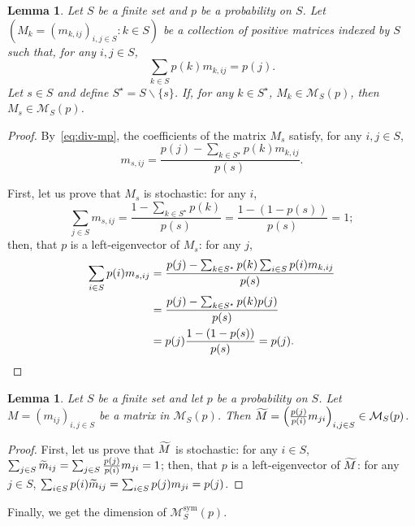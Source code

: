 \documentclass[10pt]{amsart}
\newtheorem{lemm}[theo]{Lemma}\newtheorem{prop}[theo]{Proposition}\newtheorem{coro}[theo]{Corollary}\newtheorem{conj}[theo]{Conjecture}
\theoremstyle{definition}\newtheorem{defi}[theo]{Definition}\newtheorem{rema}[theo]{Remark}\newtheorem{exam}[theo]{Example}\newtheorem{exem}[theo]{Example}\newtheorem{nota}[theo]{Notation}
\let\oldtilde\tilde
\renewcommand*{\tilde}[1]{\mathchoice{\widetilde{#1}}{\widetilde{#1}}{\oldtilde{#1}}{\oldtilde{#1}}}
\newcounter{a}
\DeclareMathOperator{\sym}{sym}
\begin{document}
\begin{lemm}\label{lem:div-mp}
Let $S$ be a finite set and $p$ be a probability on $S$. Let $(M_k= (m_{k,ij})_{i,j \in S}:k\in S)$ be a collection of positive matrices indexed by $S$ such that, for any $i,j \in S$,
\begin{equation}\label{eq:div-mp}
\sum_{k \in S} p(k) m_{k,ij} = p(j).
\end{equation}
Let $s \in S$ and define $S^\star = S \backslash \{s\}$. If, for any $k \in S^\star$, $M_k \in \mathcal{M}_S(p)$, then $M_s \in \mathcal{M}_S(p)$.
\end{lemm}

\begin{proof}
By~\eqref{eq:div-mp}, the coefficients of the matrix $M_s$ satisfy, for any $i,j \in S$,
\[
m_{s,ij} = \frac{p(j) - \sum_{k \in S^\star} p(k) m_{k,ij}}{p(s)}.
\]

First, let us prove that $M_s$ is stochastic: for any $i$,
\[
\sum_{j\in S} m_{s,ij} = \frac{1 - \sum_{k\in S^\star} p(k)}{p(s)} = \frac{1 - (1-p(s))}{p(s)} =1;
\]
then, that $p$ is a left-eigenvector of $M_s$: for any $j$,
\begin{align*}
\sum_{i \in S} p(i) m_{s,ij} & = \frac{p(j) - \sum_{k \in S^\star} p(k) \sum_{i\in S} p(i) m_{k,ij}}{p(s)}\\
& = \frac{p(j) - \sum_{k \in S^\star} p(k) p(j)}{p(s)}\\
& = p(j) \frac{1 - (1-p(s))}{p(s)} =p(j).\qedhere
\end{align*}
\end{proof}

\begin{lemm}\label{lem:div-rev}
Let $S$ be a finite set and let $p$ be a probability on $S$. Let $M= (m_{ij})_{i,j \in S}$ be a matrix in $\mathcal{M}_S(p)$. Then $\tilde{M} = \left(\frac{p(j)}{p(i)} m_{ji}\right)_{i,j \in S} \in \mathcal{M}_S(p)$.
\end{lemm}

\begin{proof}
First, let us prove that $\tilde{M}$ is stochastic: for any $i\in S$, $\sum_{j \in S} \tilde{m}_{ij}= \sum_{j \in S} \frac{p(j)}{p(i)} m_{ji} = 1$; then, that $p$ is a left-eigenvector of $\tilde{M}$: for any $j\in S$, $\sum_{i \in S} p(i)\linebreak\tilde{m}_{ij} = \sum_{i \in S} p(j) m_{ji} = p(j)$.
\end{proof}

Finally, we get the dimension of $\mathcal{M}^{\sym}_S(p)$.
\end{document}
